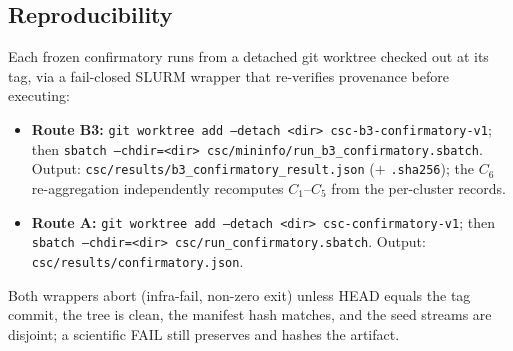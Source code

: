 \subsection{Reproducibility}
Each frozen confirmatory runs from a detached git worktree checked out at its tag, via a fail-closed SLURM
wrapper that re-verifies provenance before executing:
\begin{itemize}
  \item \textbf{Route B3:} \texttt{git worktree add --detach <dir> csc-b3-confirmatory-v1}; then
        \texttt{sbatch --chdir=<dir> csc/mininfo/run\_b3\_confirmatory.sbatch}. Output:
        \texttt{csc/results/b3\_confirmatory\_result.json} ($+$ \texttt{.sha256}); the $C_6$ re-aggregation
        independently recomputes $C_1$--$C_5$ from the per-cluster records.
  \item \textbf{Route A:} \texttt{git worktree add --detach <dir> csc-confirmatory-v1}; then
        \texttt{sbatch --chdir=<dir> csc/run\_confirmatory.sbatch}. Output:
        \texttt{csc/results/confirmatory.json}.
\end{itemize}
Both wrappers abort (infra-fail, non-zero exit) unless HEAD equals the tag commit, the tree is clean, the
manifest hash matches, and the seed streams are disjoint; a scientific FAIL still preserves and hashes the
artifact.
